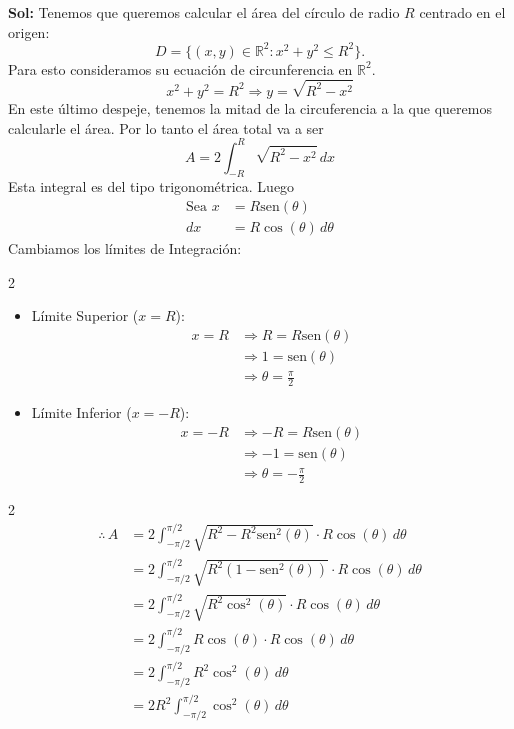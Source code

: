 \documentclass[letterpaper,12pt]{article}
\theoremstyle{plain}
\theoremstyle{definition}
\newcommand{\R}{\mathbb{R}}
\newcommand{\sen}{\text{sen}}
\begin{document}
\begin{enumerate}
\begin{enumerate}
\begin{enumerate}
\color{blue}
\textbf{Sol:} 
Tenemos que queremos calcular el área del círculo de radio $R$ centrado en el origen:
\[
D = \{(x,y) \in \mathbb{R}^2 : x^2 + y^2 \leq R^2 \}.
\]
Para esto consideramos su ecuación de circunferencia en $\R^2$.
$$
x^2 + y^2 = R^2 \Rightarrow
y = \sqrt{R^2 - x^2}
$$
En este último despeje, tenemos la mitad de la circuferencia a la que queremos calcularle el área. Por lo tanto el área total va a ser
$$A = 2 \int_{-R}^{R} \sqrt{R^2 - x^2} \, dx
$$
Esta integral es del tipo trigonométrica. Luego
\begin{align*}
\text{Sea } x &= R \sen(\theta) \\
dx &= R \cos(\theta) \, d\theta
\end{align*}
Cambiamos los límites de Integración:
\begin{multicols}{2}
\begin{itemize}
    \item Límite Superior ($x=R$):
    \begin{align*}
    x = R &\Rightarrow R = R \sen(\theta) \\
          &\Rightarrow 1 = \sen(\theta) \\
          &\Rightarrow \theta = \frac{\pi}{2}
    \end{align*}
    \item Límite Inferior ($x=-R$):
    \begin{align*}
    x = -R &\Rightarrow -R = R \sen(\theta) \\
           &\Rightarrow -1 = \sen(\theta) \\
           &\Rightarrow \theta = -\frac{\pi}{2}
    \end{align*}
\end{itemize}
\end{multicols}
\begin{multicols}{2}
\begin{align*}
\therefore \, A &= 2 \int_{-\pi/2}^{\pi/2} \sqrt{R^2 - R^2 \sen^2(\theta)} \cdot R \cos(\theta) \, d\theta \\
&= 2 \int_{-\pi/2}^{\pi/2} \sqrt{R^2(1 - \sen^2(\theta))} \cdot R \cos(\theta) \, d\theta \\
&= 2 \int_{-\pi/2}^{\pi/2} \sqrt{R^2 \cos^2(\theta)} \cdot R \cos(\theta) \, d\theta \\
&= 2 \int_{-\pi/2}^{\pi/2} R \cos(\theta) \cdot R \cos(\theta) \, d\theta \\
&= 2 \int_{-\pi/2}^{\pi/2} R^2 \cos^2(\theta) \, d\theta\\
&= 2 R^2 \int_{-\pi/2}^{\pi/2} \cos^2(\theta) \, d\theta \\

\end{align*}
\end{multicols}
\end{enumerate}
\end{enumerate}
\end{enumerate}
\end{document}
